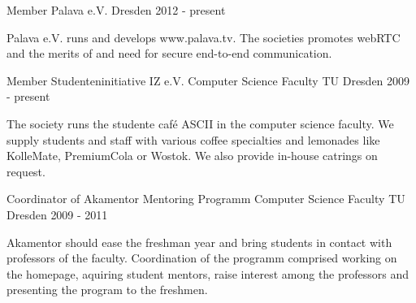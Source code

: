 \begin{cventries}
  \cventry
    {Member Palava e.V.}
    {}
    {Dresden}
    {2012 - present}
    {
      \begin{cvitems}
      \item {Palava e.V. runs and develops www.palava.tv. The societies promotes 
      webRTC and the merits of and need for secure end-to-end communication.}
      \end{cvitems}
    }
  \cventry
    {Member Studenteninitiative IZ e.V.}
    {Computer Science Faculty}
    {TU Dresden}
    {2009 - present}
    {
      \begin{cvitems}
      \item {The society runs the studente caf\'{e} ASCII in the computer science
      faculty. We supply students and staff with various coffee specialties and
      lemonades like KolleMate, PremiumCola or Wostok. We also provide in-house
      catrings on request.}
      \end{cvitems}
    }
  \cventry
    {Coordinator of Akamentor Mentoring Programm}
    {Computer Science Faculty}
    {TU Dresden}
    {2009 - 2011}
    {
      \begin{cvitems}
      \item {Akamentor should ease the freshman year and bring students in contact
      with professors of the faculty. Coordination of the programm comprised
      working on the homepage, aquiring student mentors, raise interest among
      the professors and presenting the program to the freshmen.}
      \end{cvitems}
    }
\end{cventries}
